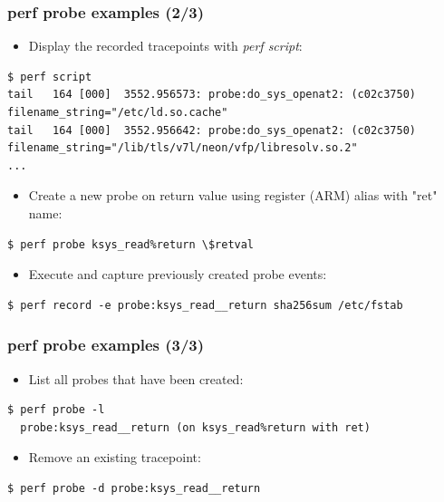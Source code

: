 \begin{frame}[fragile]
  \frametitle{perf probe examples (2/3)}

  \begin{itemize}
    \item Display the recorded tracepoints with {\em perf script}:
  \end{itemize}
  \begin{block}{}
    \begin{verbatim}
$ perf script
tail   164 [000]  3552.956573: probe:do_sys_openat2: (c02c3750) filename_string="/etc/ld.so.cache"
tail   164 [000]  3552.956642: probe:do_sys_openat2: (c02c3750) filename_string="/lib/tls/v7l/neon/vfp/libresolv.so.2"
...
    \end{verbatim}
  \end{block}
  \begin{itemize}
    \item Create a new probe on  return value using register
           (ARM) alias with "ret" name:
  \end{itemize}
  \begin{block}{}
    \begin{verbatim}
$ perf probe ksys_read%return \$retval
    \end{verbatim}
  \end{block}
  \begin{itemize}
    \item Execute  and capture previously created probe events:
  \end{itemize}
  \begin{block}{}
    \begin{verbatim}
$ perf record -e probe:ksys_read__return sha256sum /etc/fstab
    \end{verbatim}
  \end{block}
\end{frame}

\begin{frame}[fragile]
  \frametitle{perf probe examples (3/3)}

  \begin{itemize}
    \item List all probes that have been created:
  \end{itemize}
  \begin{block}{}
    \begin{verbatim}
$ perf probe -l
  probe:ksys_read__return (on ksys_read%return with ret)
    \end{verbatim}
  \end{block}
  \begin{itemize}
    \item Remove an existing tracepoint:
  \end{itemize}
  \begin{block}{}
    \begin{verbatim}
$ perf probe -d probe:ksys_read__return
    \end{verbatim}
  \end{block}
\end{frame}

